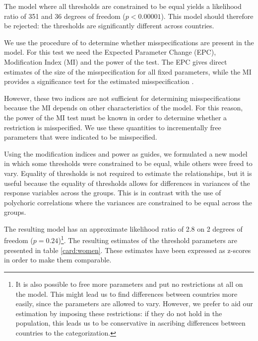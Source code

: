 \documentclass[a4paper,12pt]{article}
\begin{document}
The model where all thresholds are constrained to be equal yields a likelihood ratio of 351 and 36 degrees of freedom ($p<0.00001$). This model should therefore be rejected: the thresholds are significantly different across countries. 

We use the procedure of \citet{saris_power} to determine whether misspecifications are present in the model. For this test we need the Expected Parameter Change (EPC), Modification Index (MI) and the power of the test. The EPC gives direct estimates of the size of the misspecification for all fixed parameters, while the MI provides a significance test for the estimated misspecification \citep{saris_detection_1987}. 

However, these two indices are not sufficient for determining misspecifications because the MI depends on other characteristics of the model. For this reason, the  power of the MI test must be known in order to determine whether a restriction is misspecified. We use these quantities to incrementally free parameters that were indicated to be misspecified.

Using the modification indices and power as guides, we formulated a new model in which some thresholds were constrained to be equal, while others were freed to vary. Equality of thresholds is not required to estimate the relationships, but it is useful because the equality of thresholds allows for differences in variances of the response variables across the groups. This is in contrast with the use of polychoric correlations where the variances are constrained to be equal across the groups.

 The resulting model has an approximate likelihood ratio of 2.8 on 2 degrees of freedom ($p=0.24$)\footnote{It is also possible to free more parameters and put no restrictions at all on the model. This might lead us to find differences between countries more easily, since the parameters are allowed to vary. However, we prefer to aid our estimation by imposing these restrictions: if they do not hold in the population, this leads us to be conservative in ascribing differences between countries to the categorization.}. The resulting estimates of the threshold parameters are presented in table \ref{card:women}. These estimates have been expressed as z-scores in order to make them comparable.
\end{document}
